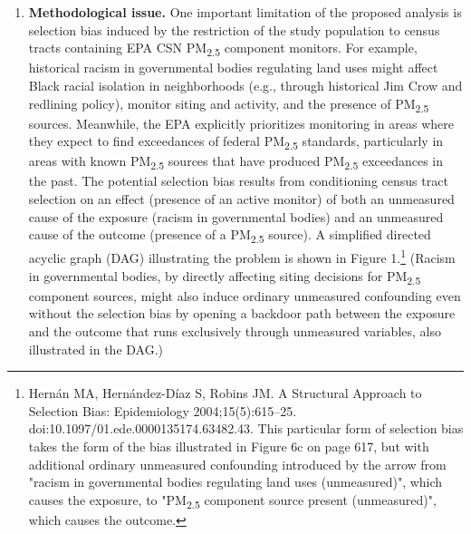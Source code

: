 \documentclass{article}\usepackage[]{graphicx}\usepackage[]{color}
\begin{document}
\begin{enumerate}[label=\textbf{\arabic*.}]
  \item \textbf{Methodological issue.} One important limitation of the proposed analysis is selection bias induced by the restriction of the study population to census tracts containing EPA CSN PM\textsubscript{2.5} component monitors. For example, historical racism in governmental bodies regulating land uses might affect Black racial isolation in neighborhoods (e.g., through historical Jim Crow and redlining policy), monitor siting and activity, and the presence of PM\textsubscript{2.5} sources. Meanwhile, the EPA explicitly prioritizes monitoring in areas where they expect to find exceedances of federal PM\textsubscript{2.5} standards, particularly in areas with known PM\textsubscript{2.5} sources that have produced PM\textsubscript{2.5} exceedances in the past. The potential selection bias results from conditioning census tract selection on an effect (presence of an active monitor) of both an unmeasured cause of the exposure (racism in governmental bodies) and an unmeasured cause of the outcome (presence of a PM\textsubscript{2.5} source). A simplified directed acyclic graph (DAG) illustrating the problem is shown in Figure 1.\footnote{Hernán MA, Hernández-Díaz S, Robins JM. A Structural Approach to Selection Bias: Epidemiology 2004;15(5):615–25. doi:10.1097/01.ede.0000135174.63482.43. This particular form of selection bias takes the form of the bias illustrated in Figure 6c on page 617, but with additional ordinary unmeasured confounding introduced by the arrow from "racism in governmental bodies regulating land uses (unmeasured)", which causes the exposure, to "PM\textsubscript{2.5} component source present (unmeasured)", which causes the outcome.} (Racism in governmental bodies, by directly affecting siting decisions for PM\textsubscript{2.5} component sources, might also induce ordinary unmeasured confounding even without the selection bias by opening a backdoor path between the exposure and the outcome that runs exclusively through unmeasured variables, also illustrated in the DAG.)
  

\end{enumerate}
\end{document}
